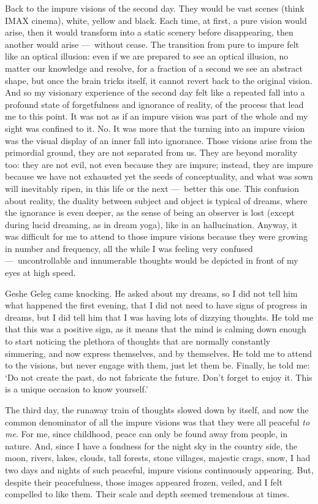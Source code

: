 \documentclass[11pt,twocolumn]{article}
\begin{document}
Back to the impure visions of the second day. They would be vast
scenes (think IMAX cinema), white, yellow and black. Each time, at
first, a pure vision would arise, then it would transform into a
static scenery before disappearing, then another would arise
---~without cease. The transition from pure to impure felt like an
optical illusion: even if we are prepared to see an optical illusion,
no matter our knowledge and resolve, for a fraction of a second we see
an abstract shape, but once the brain tricks itself, it cannot revert
back to the original vision. And so my visionary experience of the
second day felt like a repeated fall into a profound state of
forgetfulness and ignorance of reality, of the process that lead me to
this point. It was not as if an impure vision was part of the whole
and my sight was confined to it. No. It was more that the turning into
an impure vision was the visual display of an inner fall into
ignorance. Those visions arise from the primordial ground, they are
not separated from us. They are beyond morality too: they are not
evil, not even because they are impure; instead, they are impure
because we have not exhausted yet the seeds of conceptuality, and what
was sown will inevitably ripen, in this life or the next ---~better
this one. This confusion about reality, the duality between subject
and object is typical of dreams, where the ignorance is even deeper,
as the sense of being an observer is lost (except during lucid
dreaming, as in dream yoga), like in an hallucination. Anyway, it was
difficult for me to attend to those impure visions because they were
growing in number and frequency, all the while I was feeling very
confused ---~uncontrollable and innumerable thoughts would be depicted
in front of my eyes at high speed.

Geshe Geleg came knocking. He asked about my dreams, so I did not tell
him what happened the first evening, that I did not need to have signs
of progress in dreams, but I did tell him that I was having lots of
dizzying thoughts. He told me that this was a positive sign, as it
means that the mind is calming down enough to start noticing the
plethora of thoughts that are normally constantly simmering, and now
express themselves, and by themselves. He told me to attend to the
visions, but never engage with them, just let them be. Finally, he
told me: `Do not create the past, do not fabricate the future. Don't
forget to enjoy it. This is a unique occasion to know yourself.'

The third day, the runaway train of thoughts slowed down by itself,
and now the common denominator of all the impure visions was that they
were all peaceful \emph{to me}. For me, since childhood, peace can
only be found away from people, in nature. And, since I have a
fondness for the night sky in the country side, the moon, rivers,
lakes, clouds, tall forests, stone villages, majestic crags, snow, I
had two days and nights of such peaceful, impure visions continuously
appearing. But, despite their peacefulness, those images appeared
frozen, veiled, and I felt compelled to like them. Their scale and
depth seemed tremendous at times.
\end{document}
